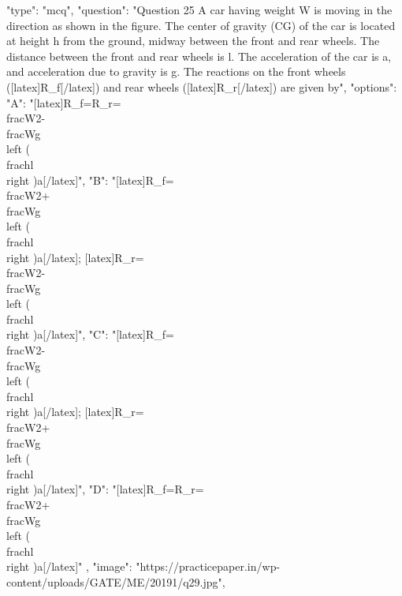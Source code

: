   {
    "type": "mcq",
    "question": "Question 25 A car having weight W is moving in the direction as shown in the figure. The center of gravity (CG) of the car is located at height h from the ground, midway between the front and rear wheels. The distance between the front and rear wheels is l. The acceleration of the car is a, and acceleration due to gravity is g. The reactions on the front wheels ([latex]R_f[/latex]) and rear wheels ([latex]R_r[/latex]) are given by",
    "options": {
      "A": "[latex]R_f=R_r=\\frac{W}{2}-\\frac{W}{g}\\left ( \\frac{h}{l} \\right )a[/latex]",
      "B": "[latex]R_f=\\frac{W}{2}+\\frac{W}{g}\\left ( \\frac{h}{l} \\right )a[/latex]; [latex]R_r=\\frac{W}{2}-\\frac{W}{g}\\left ( \\frac{h}{l} \\right )a[/latex]",
      "C": "[latex]R_f=\\frac{W}{2}-\\frac{W}{g}\\left ( \\frac{h}{l} \\right )a[/latex]; [latex]R_r=\\frac{W}{2}+\\frac{W}{g}\\left ( \\frac{h}{l} \\right )a[/latex]",
      "D": "[latex]R_f=R_r=\\frac{W}{2}+\\frac{W}{g}\\left ( \\frac{h}{l} \\right )a[/latex]"
    },
    "image": "https://practicepaper.in/wp-content/uploads/GATE/ME/20191/q29.jpg",
}
